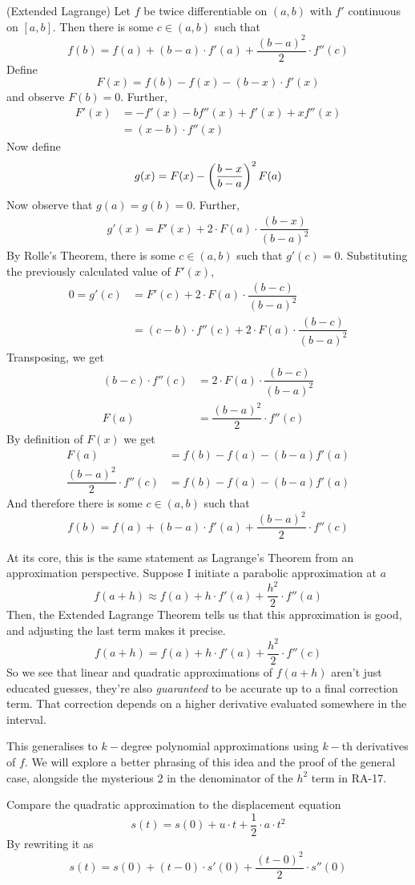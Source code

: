 \begin{SWP}{\thm}{(Extended Lagrange) Let $f$ be twice differentiable on $(a, b)$ with $f'$ continuous on $[a, b]$. Then there is some $c\in (a, b)$ such that
$$
f(b) = f(a) + (b - a)\cdot f'(a) + \frac{(b - a)^2}{2}\cdot f''(c)
$$}Define
$$
F(x) = f(b) - f(x) - (b - x)\cdot f'(x)
$$
and observe $F(b) = 0$. Further,\begin{align*}
F'(x) &= - f'(x) - bf''(x) + f'(x) + xf''(x)\\
	  &= (x - b)\cdot f''(x)
\end{align*}
Now define
$$
g(x) = F(x) - \left ( {\dfrac{b - x}{b - a}} \right )^2F(a)
$$
Now observe that $g(a) = g(b) = 0$. Further,
\begin{align*}
g'(x) = F'(x) + 2\cdot F(a)\cdot \dfrac{(b - x)}{(b - a)^2}
\end{align*}
By Rolle's Theorem, there is some $c \in (a, b)$ such that $g'(c) = 0$. Substituting the previously calculated value of $F'(x)$,
\begin{align*}
0 = g'(c) &= F'(c) + 2\cdot F(a)\cdot \dfrac{(b - c)}{(b - a)^2}\\
          &= (c - b)\cdot f''(c) + 2\cdot F(a)\cdot \dfrac{(b - c)}{(b - a)^2}
\end{align*}
Transposing, we get
\begin{align*}
(b - c)\cdot f''(c) &= 2\cdot F(a)\cdot \dfrac{(b - c)}{(b - a)^2}\\
F(a) &= \dfrac{(b - a)^2}{2}\cdot f''(c)
\end{align*}
By definition of $F(x)$ we get
\begin{align*}
F(a) &= f(b) - f(a) - (b - a)f'(a)\\
\dfrac{(b - a)^2}{2}\cdot f''(c) &= f(b) - f(a) - (b - a)f'(a)
\end{align*}
And therefore there is some $c \in (a, b)$ such that
$$
f(b) = f(a) + (b - a)\cdot f'(a) + \dfrac{(b - a)^2}{2}\cdot f''(c)
$$
\end{SWP}
\newpage
At its core, this is the same statement as Lagrange's Theorem from an approximation perspective. Suppose I initiate a parabolic approximation at $a$
$$
f(a + h) \approx f(a) + h\cdot f'(a) + \dfrac{h^2}{2}\cdot f''(a)
$$
Then, the Extended Lagrange Theorem tells us that this approximation is good, and adjusting the last term makes it precise.
$$
f(a + h) = f(a) + h\cdot f'(a) + \dfrac{h^2}{2}\cdot f''(c)
$$
So we see that linear and quadratic approximations of $f(a+h)$ aren’t just educated guesses, they're also \emph{guaranteed} to be accurate up to a final correction term. That correction depends on a higher derivative evaluated somewhere in the interval.

This generalises to $k-$degree polynomial approximations using $k-$th derivatives of $f$. We will explore a better phrasing of this idea and the proof of the general case, alongside the mysterious $2$ in the denominator of the $h^2$ term in RA-17.

\begin{SNP}{\xmp}Compare the quadratic approximation to the displacement equation
$$
s(t) = s(0) + u\cdot t + \dfrac{1}{2}\cdot a\cdot t^2
$$
By rewriting it as
$$
s(t) = s(0) + (t - 0)\cdot s'(0) + \dfrac{(t - 0)^2}{2}\cdot s''(0)
$$
\end{SNP}

